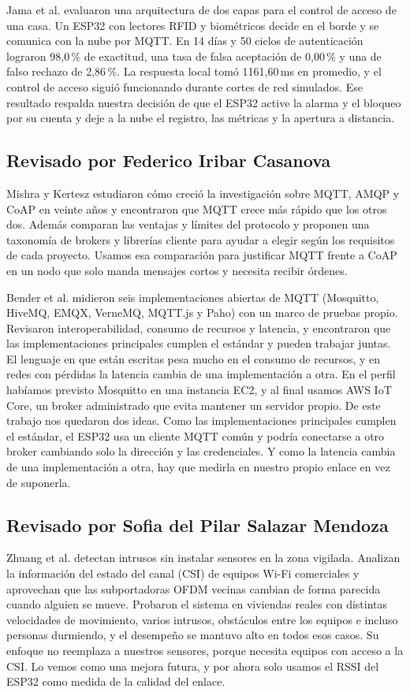 \documentclass[manuscript,screen,nonacm]{acmart}
\begin{document}
Jama et al. \cite{jama2026edge} evaluaron una arquitectura de dos capas para el control de acceso de una casa. Un ESP32 con lectores RFID y biométricos decide en el borde y se comunica con la nube por MQTT. En 14 días y 50 ciclos de autenticación lograron 98,0\,\% de exactitud, una tasa de falsa aceptación de 0,00\,\% y una de falso rechazo de 2,86\,\%. La respuesta local tomó 1161,60\,ms en promedio, y el control de acceso siguió funcionando durante cortes de red simulados. Ese resultado respalda nuestra decisión de que el ESP32 active la alarma y el bloqueo por su cuenta y deje a la nube el registro, las métricas y la apertura a distancia.

\subsection{Revisado por Federico Iribar Casanova}
Mishra y Kertesz \cite{mishra2020mqtt} estudiaron cómo creció la investigación sobre MQTT, AMQP y CoAP en veinte años y encontraron que MQTT crece más rápido que los otros dos. Además comparan las ventajas y límites del protocolo y proponen una taxonomía de brokers y librerías cliente para ayudar a elegir según los requisitos de cada proyecto. Usamos esa comparación para justificar MQTT frente a CoAP en un nodo que solo manda mensajes cortos y necesita recibir órdenes.

Bender et al. \cite{bender2021mqtt} midieron seis implementaciones abiertas de MQTT (Mosquitto, HiveMQ, EMQX, VerneMQ, MQTT.js y Paho) con un marco de pruebas propio. Revisaron interoperabilidad, consumo de recursos y latencia, y encontraron que las implementaciones principales cumplen el estándar y pueden trabajar juntas. El lenguaje en que están escritas pesa mucho en el consumo de recursos, y en redes con pérdidas la latencia cambia de una implementación a otra. En el perfil habíamos previsto Mosquitto en una instancia EC2, y al final usamos AWS IoT Core, un broker administrado que evita mantener un servidor propio. De este trabajo nos quedaron dos ideas. Como las implementaciones principales cumplen el estándar, el ESP32 usa un cliente MQTT común y podría conectarse a otro broker cambiando solo la dirección y las credenciales. Y como la latencia cambia de una implementación a otra, hay que medirla en nuestro propio enlace en vez de suponerla.

\subsection{Revisado por Sofia del Pilar Salazar Mendoza}
Zhuang et al. \cite{zhuang2021intrusion} detectan intrusos sin instalar sensores en la zona vigilada. Analizan la información del estado del canal (CSI) de equipos Wi-Fi comerciales y aprovechan que las subportadoras OFDM vecinas cambian de forma parecida cuando alguien se mueve. Probaron el sistema en viviendas reales con distintas velocidades de movimiento, varios intrusos, obstáculos entre los equipos e incluso personas durmiendo, y el desempeño se mantuvo alto en todos esos casos. Su enfoque no reemplaza a nuestros sensores, porque necesita equipos con acceso a la CSI. Lo vemos como una mejora futura, y por ahora solo usamos el RSSI del ESP32 como medida de la calidad del enlace.
\end{document}
